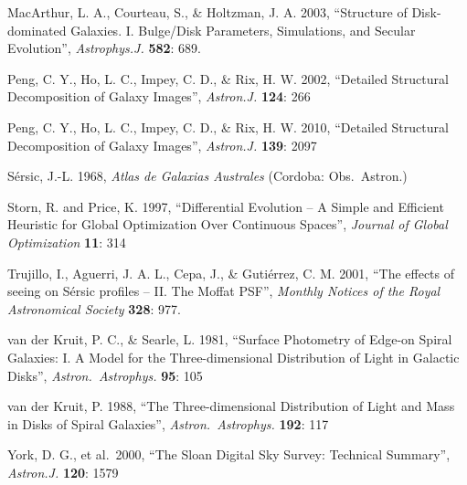 \documentclass[10pt]{article}
\begin{document}
\begin{thebibliography}{}
 MacArthur, L. A.,
Courteau, S., \& Holtzman, J. A. 2003, ``Structure of Disk-dominated Galaxies.
I. Bulge/Disk Parameters, Simulations, and Secular Evolution'',
\textit{Astrophys.J.} \textbf{582}: 689.

 Peng, C. Y., Ho, L. C., Impey, C. D., \&
Rix, H. W. 2002, ``Detailed Structural Decomposition of Galaxy Images'',
\textit{Astron.J.} \textbf{124}: 266

 Peng, C. Y., Ho, L. C., Impey, C. D., \&
Rix, H. W. 2010, ``Detailed Structural Decomposition of Galaxy Images'',
\textit{Astron.J.} \textbf{139}: 2097

 S{\'e}rsic, J.-L. 1968, \textit{Atlas de 
Galaxias Australes} (Cordoba: Obs.\ Astron.)

 Storn, R. and Price, K. 1997, ``Differential Evolution --
A Simple and Efficient Heuristic for Global Optimization Over Continuous Spaces'', 
\textit{Journal of Global Optimization} \textbf{11}: 314

 Trujillo, I., Aguerri, J. A. L.,
Cepa, J., \& Guti{\'e}rrez, C. M. 2001, ``The effects of seeing on S{\'e}rsic
profiles -- II. The Moffat PSF'', \textit{Monthly Notices of the Royal
Astronomical Society} \textbf{328}: 977.

 van der Kruit, P. C., \&
Searle, L. 1981, ``Surface Photometry of Edge-on Spiral Galaxies: I. A
Model for the Three-dimensional Distribution of Light in Galactic
Disks'', \textit{Astron.\ Astrophys.} \textbf{95}: 105

 van der Kruit, P. 1988, ``The
Three-dimensional Distribution of Light and Mass in Disks of Spiral
Galaxies'', \textit{Astron.\ Astrophys.} \textbf{192}: 117

 York, D. G., et al.\ 2000, ``The Sloan Digital 
Sky Survey: Technical Summary'', \textit{Astron.J.} \textbf{120}: 1579


\end{thebibliography}
%
\end{document}
